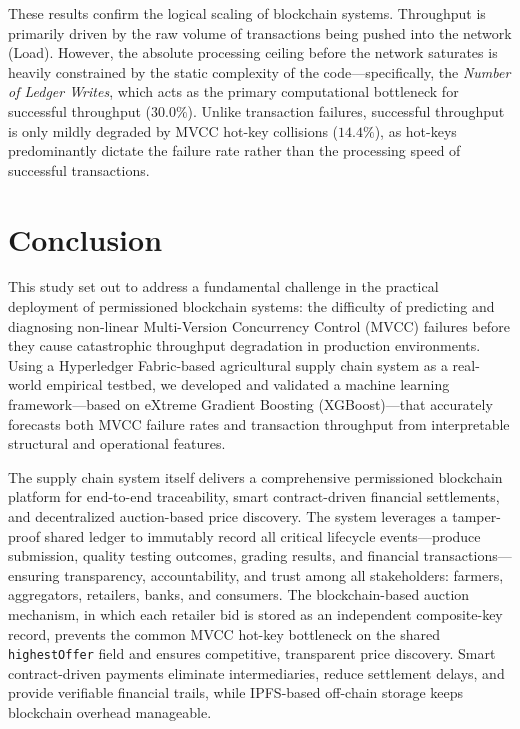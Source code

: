 \documentclass[manuscript,screen]{acmart}
\begin{document}
	These results confirm the logical scaling of blockchain systems. Throughput is primarily driven by the raw volume of transactions being pushed into the network (Load). However, the absolute processing ceiling before the network saturates is heavily constrained by the static complexity of the code---specifically, the \textit{Number of Ledger Writes}, which acts as the primary computational bottleneck for successful throughput ($30.0\%$). Unlike transaction failures, successful throughput is only mildly degraded by MVCC hot-key collisions ($14.4\%$), as hot-keys predominantly dictate the failure rate rather than the processing speed of successful transactions.

	\section{Conclusion}
	
	This study set out to address a fundamental challenge in the practical deployment of permissioned blockchain systems: the difficulty of predicting and diagnosing non-linear Multi-Version Concurrency Control (MVCC) failures before they cause catastrophic throughput degradation in production environments. Using a Hyperledger Fabric-based agricultural supply chain system as a real-world empirical testbed, we developed and validated a machine learning framework—based on eXtreme Gradient Boosting (XGBoost)—that accurately forecasts both MVCC failure rates and transaction throughput from interpretable structural and operational features.
	
	The supply chain system itself delivers a comprehensive permissioned blockchain platform for end-to-end traceability, smart contract-driven financial settlements, and decentralized auction-based price discovery. The system leverages a tamper-proof shared ledger to immutably record all critical lifecycle events—produce submission, quality testing outcomes, grading results, and financial transactions—ensuring transparency, accountability, and trust among all stakeholders: farmers, aggregators, retailers, banks, and consumers. The blockchain-based auction mechanism, in which each retailer bid is stored as an independent composite-key record, prevents the common MVCC hot-key bottleneck on the shared \texttt{highestOffer} field and ensures competitive, transparent price discovery. Smart contract-driven payments eliminate intermediaries, reduce settlement delays, and provide verifiable financial trails, while IPFS-based off-chain storage keeps blockchain overhead manageable.
	
\end{document}
